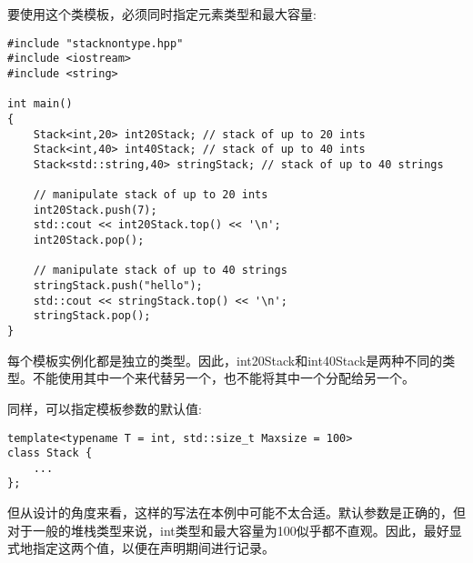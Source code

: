 要使用这个类模板，必须同时指定元素类型和最大容量:

\begin{lstlisting}[style=styleCXX]
#include "stacknontype.hpp"
#include <iostream>
#include <string>

int main()
{
	Stack<int,20> int20Stack; // stack of up to 20 ints
	Stack<int,40> int40Stack; // stack of up to 40 ints
	Stack<std::string,40> stringStack; // stack of up to 40 strings
	
	// manipulate stack of up to 20 ints
	int20Stack.push(7);
	std::cout << int20Stack.top() << '\n';
	int20Stack.pop();
	
	// manipulate stack of up to 40 strings
	stringStack.push("hello");
	std::cout << stringStack.top() << '\n';
	stringStack.pop();
}
\end{lstlisting}

每个模板实例化都是独立的类型。因此，int20Stack和int40Stack是两种不同的类型。不能使用其中一个来代替另一个，也不能将其中一个分配给另一个。

同样，可以指定模板参数的默认值:

\begin{lstlisting}[style=styleCXX]
template<typename T = int, std::size_t Maxsize = 100>
class Stack {
	...
};
\end{lstlisting}

但从设计的角度来看，这样的写法在本例中可能不太合适。默认参数是正确的，但对于一般的堆栈类型来说，int类型和最大容量为100似乎都不直观。因此，最好显式地指定这两个值，以便在声明期间进行记录。





























